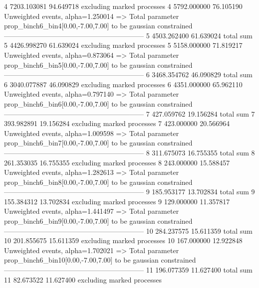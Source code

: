 4          7203.103081     94.649718       excluding marked processes    
4          5792.000000     76.105190       Unweighted events, alpha=1.250014
  => Total parameter prop_binch6_bin4[0.00,-7.00,7.00] to be gaussian constrained
------------------------------------------------------------
5          4503.262400     61.639024       total sum                     
5          4426.998270     61.639024       excluding marked processes    
5          5158.000000     71.819217       Unweighted events, alpha=0.873064
  => Total parameter prop_binch6_bin5[0.00,-7.00,7.00] to be gaussian constrained
------------------------------------------------------------
6          3468.354762     46.090829       total sum                     
6          3040.077887     46.090829       excluding marked processes    
6          4351.000000     65.962110       Unweighted events, alpha=0.797140
  => Total parameter prop_binch6_bin6[0.00,-7.00,7.00] to be gaussian constrained
------------------------------------------------------------
7          427.059762      19.156284       total sum                     
7          393.982891      19.156284       excluding marked processes    
7          423.000000      20.566964       Unweighted events, alpha=1.009598
  => Total parameter prop_binch6_bin7[0.00,-7.00,7.00] to be gaussian constrained
------------------------------------------------------------
8          311.675073      16.755355       total sum                     
8          261.353035      16.755355       excluding marked processes    
8          243.000000      15.588457       Unweighted events, alpha=1.282613
  => Total parameter prop_binch6_bin8[0.00,-7.00,7.00] to be gaussian constrained
------------------------------------------------------------
9          185.953177      13.702834       total sum                     
9          155.384312      13.702834       excluding marked processes    
9          129.000000      11.357817       Unweighted events, alpha=1.441497
  => Total parameter prop_binch6_bin9[0.00,-7.00,7.00] to be gaussian constrained
------------------------------------------------------------
10         284.237575      15.611359       total sum                     
10         201.855675      15.611359       excluding marked processes    
10         167.000000      12.922848       Unweighted events, alpha=1.702021
  => Total parameter prop_binch6_bin10[0.00,-7.00,7.00] to be gaussian constrained
------------------------------------------------------------
11         196.077359      11.627400       total sum                     
11         82.673522       11.627400       excluding marked processes    
